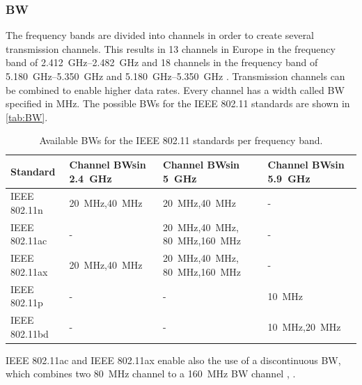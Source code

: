 \subsubsection*{\acf{BW}}
The frequency bands are divided into channels in order to create several transmission channels.
This results in 13 channels in Europe in the frequency band of \SIrange{2.412}{2.482}{\giga\hertz} and 18 channels in the frequency band of \SIrange{5.180}{5.350}{\giga\hertz} and \SIrange{5.180}{5.350}{\giga\hertz} \cite{sauter_wireless_2022}.
Transmission channels can be combined to enable higher data rates.
Every channel has a width called \ac{BW} specified in \si{\mega\hertz}.
The possible \ac{BW}s for the IEEE 802.11 standards are shown in \autoref{tab:BW}.
\begin{table}[!ht]
	\centering
	\begin{tabular}{>{\raggedright}p{2.2cm}p{2.50cm}p{2.55cm}p{2.50cm}}
		\toprule
		Standard & Channel \ac{BW}s\newline in \SI{2.4}{\giga\hertz}& Channel \ac{BW}s\newline in \SI{5}{\giga\hertz} &  Channel \ac{BW}s\newline in  \SI{5.9}{\giga\hertz}\\
		\midrule
		IEEE 802.11n \cite{sauter_wireless_2022}& \SI{20}{\mega\hertz},\SI{40}{\mega\hertz}  & \SI{20}{\mega\hertz},\SI{40}{\mega\hertz} & - \\
		\midrule
		IEEE 802.11ac \cite{noauthor_ieee_2021-1}& -  & \SI{20}{\mega\hertz},\SI{40}{\mega\hertz}, \SI{80}{\mega\hertz},\SI{160}{\mega\hertz} & - \\
		\midrule
		IEEE 802.11ax \cite{noauthor_ieee_2021}&\SI{20}{\mega\hertz},\SI{40}{\mega\hertz}  & \SI{20}{\mega\hertz},\SI{40}{\mega\hertz}, \SI{80}{\mega\hertz},\SI{160}{\mega\hertz} & - \\
		\midrule
		IEEE 802.11p \cite{jacob_system-level_2020}& - & - & \SI{10}{\mega\hertz} \\
		\midrule
		IEEE 802.11bd \cite{jacob_system-level_2020}& - & - & \SI{10}{\mega\hertz},\SI{20}{\mega\hertz} \\
		\bottomrule
	\end{tabular}
	\caption{Available \ac{BW}s for the IEEE 802.11 standards per frequency band.}
	\label{tab:BW}
\end{table}

IEEE 802.11ac and IEEE 802.11ax enable also the use of a discontinuous \ac{BW}, which combines two \SI{80}{\mega\hertz}
channel to a \SI{160}{\mega\hertz} \ac{BW} channel \cite{noauthor_ieee_2021}, \cite{noauthor_ieee_2021-1}.

